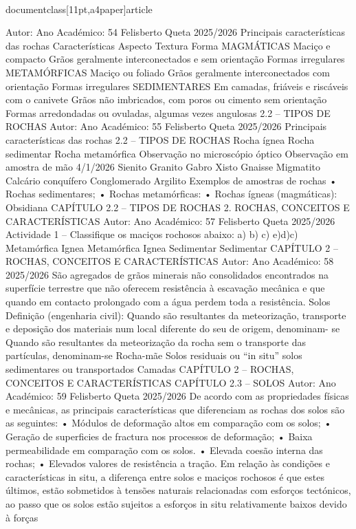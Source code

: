 \\documentclass[11pt,a4paper]{article}
\begin{document}
Autor:
Ano Académico:
54
Felisberto Queta
2025/2026
Principais características das rochas
Características
Aspecto
Textura
Forma
MAGMÁTICAS
Maciço e compacto
Grãos geralmente 
interconectados e sem 
orientação
Formas irregulares
METAMÓRFICAS
Maciço ou foliado
Grãos geralmente 
interconectados com 
orientação
Formas irregulares
SEDIMENTARES
Em camadas, friáveis e riscáveis 
com o canivete
Grãos não imbricados, com 
poros ou cimento sem orientação
Formas arredondadas ou 
ovuladas, algumas vezes 
angulosas
2.2 – TIPOS DE ROCHAS
Autor:
Ano Académico:
55
Felisberto Queta
2025/2026
Principais características das rochas
2.2 – TIPOS DE ROCHAS
Rocha ígnea Rocha sedimentar Rocha metamórfica 
Observação no 
microscópio óptico
Observação em 
amostra de mão 
4/1/2026
Sienito Granito Gabro 
Xisto Gnaisse Migmatito 
Calcário conquífero Conglomerado Argilito 
Exemplos de amostras de rochas
• Rochas 
sedimentares; 
• Rochas 
metamórficas:
• Rochas ígneas 
(magmáticas):
Obsidiana 
CAPÍTULO 2.2 – TIPOS DE ROCHAS
2. ROCHAS, CONCEITOS E CARACTERÍSTICAS
Autor:
Ano Académico:
57
Felisberto Queta
2025/2026
Actividade 1 – Classifique os maciços rochosos abaixo:
a) b) c)
e)d)c)
Metamórfica Ignea 
Metamórfica Ignea Sedimentar 
Sedimentar 
CAPÍTULO 2 
–
 ROCHAS, CONCEITOS E CARACTERÍSTICAS
Autor:
Ano Académico:
58
2025/2026
São agregados de grãos minerais não consolidados encontrados na superfície terrestre que não oferecem 
resistência à escavação mecânica e que quando em contacto prolongado com a água perdem toda a resistência.
Solos
Definição (engenharia civil):
Quando são resultantes da meteorização,
transporte e deposição dos materiais num
local diferente do seu de origem, denominam-
se
Quando são resultantes da meteorização da
rocha sem o transporte das partículas,
denominam-se
 Rocha-mãe
Solos residuais ou “in situ”
solos sedimentares ou transportados
Camadas
CAPÍTULO 2 
–
 ROCHAS, CONCEITOS E CARACTERÍSTICAS
CAPÍTULO 2.3 – SOLOS 
Autor:
Ano Académico:
59
Felisberto Queta
2025/2026
De acordo com as propriedades físicas e mecânicas, as principais características que 
diferenciam as rochas dos solos são as seguintes:
• Módulos de deformação altos em comparação com os solos; 
• Geração de superficies de fractura nos processos de deformação;
• Baixa permeabilidade em comparação com os solos.  
• Elevada coesão interna das rochas;
• Elevados valores de resistência a tração.
Em relação às condições e características in situ, a diferença entre solos e maciços rochosos é 
que estes últimos, estão sobmetidos à tensões naturais relacionadas com esforços tectónicos, ao
passo que os solos estão sujeitos a esforços in situ relativamente baixos devido à forças
\end{document}
